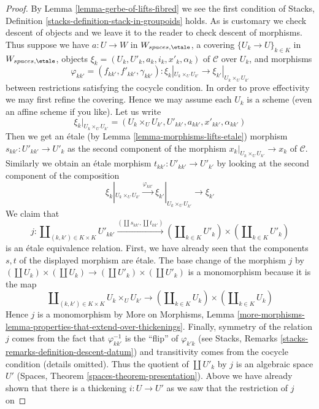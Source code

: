 \begin{proof}
By Lemma \ref{lemma-gerbe-of-lifts-fibred} we see the first condition
of Stacks, Definition \ref{stacks-definition-stack-in-groupoids} holds.
As is customary we check descent of objects and we leave it to the reader
to check descent of morphisms. Thus suppose we have $a : U \to W$
in $W_{spaces, \etale}$, a covering $\{U_k \to U\}_{k \in K}$ in
$W_{spaces, \etale}$, objects $\xi_k = (U_k, U'_k, a_k, i_k, x'_k, \alpha_k)$
of $\mathcal{C}$ over $U_k$, and morphisms
$$
\varphi_{kk'} = (f_{kk'}, f'_{kk'}, \gamma_{kk'}) :
\xi_k|_{U_k \times_U U_{k'}} \to
\xi_{k'}|_{U_k \times_U U_{k'}}
$$
between restrictions satisfying the cocycle condition. In order to prove
effectivity we may first refine the covering. Hence we may assume each
$U_k$ is a scheme (even an affine scheme if you like). Let us write
$$
\xi_k|_{U_k \times_U U_{k'}} =
(U_k \times_U U_{k'}, U'_{kk'}, a_{kk'}, x'_{kk'}, \alpha_{kk'})
$$
Then we get an \'etale (by Lemma \ref{lemma-morphisms-lifts-etale}) morphism
$s_{kk'} : U'_{kk'} \to U'_k$
as the second component of the morphism
$x_k|_{U_k \times_U U_{k'}} \to x_k$ of $\mathcal{C}$.
Similarly we obtain an \'etale morphism $t_{kk'} : U'_{kk'} \to U'_{k'}$
by looking at the second component of the composition
$$
\xi_k|_{U_k \times_U U_{k'}} \xrightarrow{\varphi_{kk'}}
\xi_{k'}|_{U_k \times_U U_{k'}} \to \xi_{k'}
$$
We claim that
$$
j :
\coprod\nolimits_{(k, k') \in K \times K} U'_{kk'}
\xrightarrow{(\coprod s_{kk'}, \coprod t_{kk'})}
(\coprod\nolimits_{k \in K} U'_k) \times (\coprod\nolimits_{k \in K} U'_k)
$$
is an \'etale equivalence relation. First, we have already seen
that the components $s, t$ of the displayed morphism are \'etale.
The base change of the morphism $j$ by
$(\coprod U_k) \times (\coprod U_k) \to (\coprod U'_k) \times (\coprod U'_k)$
is a monomorphism because it is the map
$$
\coprod\nolimits_{(k, k') \in K \times K} U_k \times_U U_{k'}
\longrightarrow
(\coprod\nolimits_{k \in K} U_k) \times (\coprod\nolimits_{k \in K} U_k)
$$
Hence $j$ is a monomorphism by More on Morphisms, Lemma
\ref{more-morphisms-lemma-properties-that-extend-over-thickenings}.
Finally, symmetry of the relation $j$ comes from the fact that
$\varphi_{kk'}^{-1}$ is the ``flip'' of $\varphi_{k'k}$ (see
Stacks, Remarks \ref{stacks-remarks-definition-descent-datum})
and transitivity comes from the cocycle condition (details omitted).
Thus the quotient of $\coprod U'_k$ by $j$ is an algebraic space $U'$
(Spaces, Theorem \ref{spaces-theorem-presentation}).
Above we have already shown that there is a thickening
$i : U \to U'$ as we saw that the restriction of $j$ on

\end{proof}
